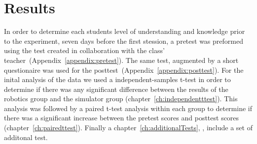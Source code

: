 \chapter{Results}
In order to determine each students level of understanding and knowledge prior to the experiment, seven days before the first stession, a pretest was preformed using the test created in collaboration with the class' teacher~(Appendix~\ref{appendix:pretest}). 
The same test, augmented by a short questionaire was used for the posttest~(Appendix~\ref{appendix:posttest}).
For the inital analysis of the data we used a independent-samples t-test in order to determine if there was any
significant difference between the results of the robotics group and the simulator group (chapter~\ref{ch:independentttest}).
This analysis was followed by a paired t-test analysis within each group 
to determine if there was a significant increase between the pretest scores and posttest scores (chapter~\ref{ch:pairedttest}).
Finally a chapter~\ref{ch:additionalTests}, , include a set of additonal test. 





